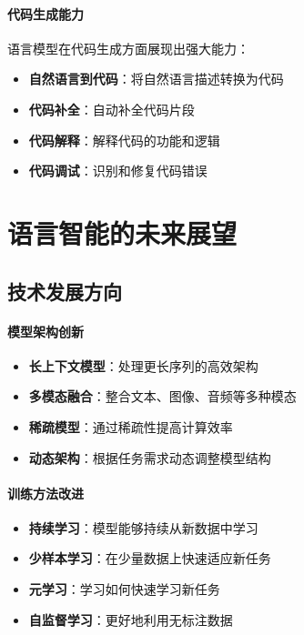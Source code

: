 \paragraph{代码生成能力}
语言模型在代码生成方面展现出强大能力：

\begin{itemize}
\item \textbf{自然语言到代码}：将自然语言描述转换为代码
\item \textbf{代码补全}：自动补全代码片段
\item \textbf{代码解释}：解释代码的功能和逻辑
\item \textbf{代码调试}：识别和修复代码错误
\end{itemize}

\section{语言智能的未来展望}

\subsection{技术发展方向}

\paragraph{模型架构创新}
\begin{itemize}
\item \textbf{长上下文模型}：处理更长序列的高效架构
\item \textbf{多模态融合}：整合文本、图像、音频等多种模态
\item \textbf{稀疏模型}：通过稀疏性提高计算效率
\item \textbf{动态架构}：根据任务需求动态调整模型结构
\end{itemize}

\paragraph{训练方法改进}
\begin{itemize}
\item \textbf{持续学习}：模型能够持续从新数据中学习
\item \textbf{少样本学习}：在少量数据上快速适应新任务
\item \textbf{元学习}：学习如何快速学习新任务
\item \textbf{自监督学习}：更好地利用无标注数据
\end{itemize}


